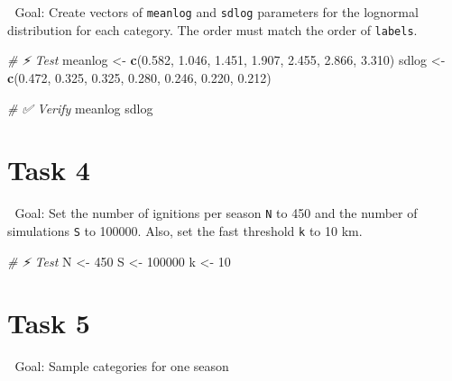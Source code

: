 \documentclass[
  12pt,
]{scrreprt}
\newenvironment{Shaded}{\begin{snugshade}}{\end{snugshade}}
\newcommand{\CommentTok}[1]{\textcolor[rgb]{0.56,0.35,0.01}{\textit{#1}}}
\newcommand{\DecValTok}[1]{\textcolor[rgb]{0.00,0.00,0.81}{#1}}
\newcommand{\FloatTok}[1]{\textcolor[rgb]{0.00,0.00,0.81}{#1}}
\newcommand{\FunctionTok}[1]{\textcolor[rgb]{0.13,0.29,0.53}{\textbf{#1}}}
\newcommand{\NormalTok}[1]{#1}
\newcommand{\OtherTok}[1]{\textcolor[rgb]{0.56,0.35,0.01}{#1}}
\begin{document}
🎯 Goal: Create vectors of \texttt{meanlog} and \texttt{sdlog} parameters for the lognormal distribution for each category. The order must match the order of \texttt{labels}.

\begin{Shaded}
\begin{Highlighting}[]
\CommentTok{\# ⚡ Test}
\NormalTok{meanlog }\OtherTok{\textless{}{-}} \FunctionTok{c}\NormalTok{(}\FloatTok{0.582}\NormalTok{, }\FloatTok{1.046}\NormalTok{, }\FloatTok{1.451}\NormalTok{, }\FloatTok{1.907}\NormalTok{, }\FloatTok{2.455}\NormalTok{, }\FloatTok{2.866}\NormalTok{, }\FloatTok{3.310}\NormalTok{)}
\NormalTok{sdlog   }\OtherTok{\textless{}{-}} \FunctionTok{c}\NormalTok{(}\FloatTok{0.472}\NormalTok{, }\FloatTok{0.325}\NormalTok{, }\FloatTok{0.325}\NormalTok{, }\FloatTok{0.280}\NormalTok{, }\FloatTok{0.246}\NormalTok{, }\FloatTok{0.220}\NormalTok{, }\FloatTok{0.212}\NormalTok{)}
\end{Highlighting}
\end{Shaded}

\begin{Shaded}
\begin{Highlighting}[]
\CommentTok{\# ✅  Verify}
\NormalTok{meanlog}
\NormalTok{sdlog}
\end{Highlighting}
\end{Shaded}

\section{Task 4}\label{task-4-2}

🎯 Goal: Set the number of ignitions per season \texttt{N} to 450 and the number of simulations \texttt{S} to 100000. Also, set the fast threshold \texttt{k} to 10 km.

\begin{Shaded}
\begin{Highlighting}[]
\CommentTok{\# ⚡ Test}
\NormalTok{N }\OtherTok{\textless{}{-}} \DecValTok{450}
\NormalTok{S }\OtherTok{\textless{}{-}} \DecValTok{100000}
\NormalTok{k }\OtherTok{\textless{}{-}} \DecValTok{10} 
\end{Highlighting}
\end{Shaded}

\section{Task 5}\label{task-5-1}

🎯 Goal: Sample categories for one season
\end{document}
